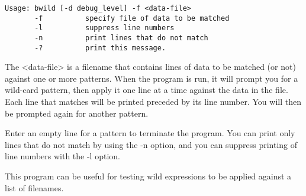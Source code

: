 \begin{verbatim}
Usage: bwild [-d debug_level] -f <data-file>
       -f          specify file of data to be matched
       -l          suppress line numbers
       -n          print lines that do not match
       -?          print this message.
\end{verbatim}

The {\textless}data-file{\textgreater} is a filename that contains lines
of data to be matched (or not) against one or more patterns.
When the program is run, it will prompt you for a wild-card
pattern, then apply it one line at a time against
the data in the file. Each line that matches will be printed
preceded by its line number.  You will then be prompted again
for another pattern.

Enter an empty line for a pattern to terminate the program. You
can print only lines that do not match by using the -n option,
and you can suppress printing of line numbers with the -l option.

This program can be useful for testing wild expressions to be
applied against a list of filenames.

